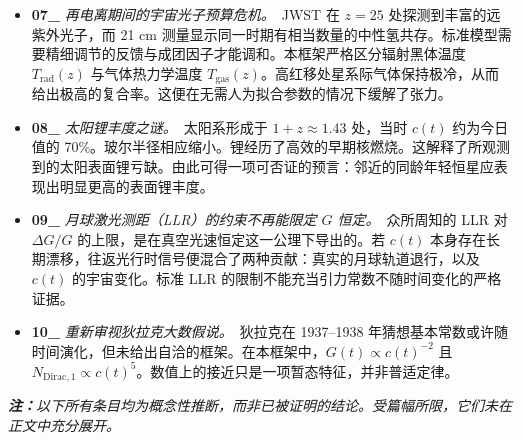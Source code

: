 \documentclass[12pt,leqno]{article}
\begin{document}
\begin{itemize}
		\item \textbf{07\_} \textit{再电离期间的宇宙光子预算危机。}\,\,\,JWST 在 $z=25$ 处探测到丰富的远紫外光子，而 21 cm 测量显示同一时期有相当数量的中性氢共存。标准模型需要精细调节的反馈与成团因子才能调和。本框架严格区分辐射黑体温度 $T_\mathrm{rad}(z)$ 与气体热力学温度 $T_\mathrm{gas}(z)$。高红移处星系际气体保持极冷，从而给出极高的复合率。这便在无需人为拟合参数的情况下缓解了张力。
		
		\item \textbf{08\_} \textit{太阳锂丰度之谜。}\,\,\,太阳系形成于 $1+z\approx1.43$ 处，当时 $c(t)$ 约为今日值的 70\%。玻尔半径相应缩小。锂经历了高效的早期核燃烧。这解释了所观测到的太阳表面锂亏缺。由此可得一项可否证的预言：邻近的同龄年轻恒星应表现出明显更高的表面锂丰度。
		
		\item \textbf{09\_} \textit{月球激光测距（LLR）的约束不再能限定 $G$ 恒定。}\,\,\,众所周知的 LLR 对 $\Delta G/G$ 的上限，是在真空光速恒定这一公理下导出的。若 $c(t)$ 本身存在长期漂移，往返光行时信号便混合了两种贡献：真实的月球轨道退行，以及 $c(t)$ 的宇宙变化。标准 LLR 的限制不能充当引力常数不随时间变化的严格证据。
		
		\item \textbf{10\_} \textit{重新审视狄拉克大数假说。}\,\,\,狄拉克在 1937--1938 年猜想基本常数或许随时间演化，但未给出自洽的框架。在本框架中，$G(t)\propto c(t)^{-2}$ 且 $N_\mathrm{Dirac,1}\propto c(t)^5$。数值上的接近只是一项暂态特征，并非普适定律。 
	\end{itemize}
	
	
	\bigskip
	\textit{\textbf{注：}以下所有条目均为概念性推断，而非已被证明的结论。受篇幅所限，它们未在正文中充分展开。}
	
\end{document}
